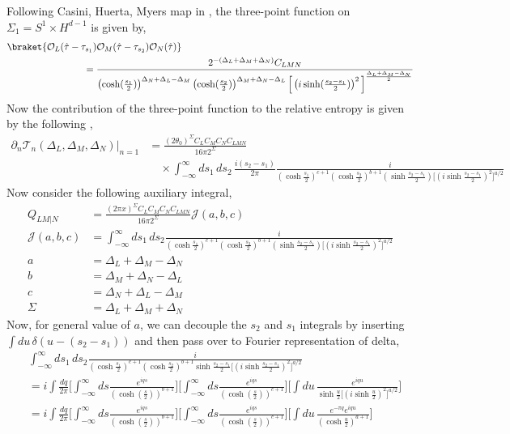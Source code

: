 \documentclass[11pt]{article}
\newcommand{\p}{\partial}
\newcommand{\mO}{\mathcal{O}}
\newcommand{\nn}{\nonumber}
\newcommand{\lb}{\left(}
\newcommand{\rb}{\right)}
\begin{document}
Following Casini, Huerta, Myers map in \cite{Casini_2011}, the three-point function on $\Sigma_1 = S^1 \times H^{d-1}$ is given by,
\begin{align}
    &\braket{\mO_L (\hat \tau - \tau_{s_1})\mO_M(\hat\tau - \tau_{s_2})\mO_N(\hat \tau)} \nn\\&\qquad\qquad\qquad\qquad=\frac{2^{-\lb \Delta_L+\Delta_M+\Delta_N\rb}C_{LMN}}{\lb\cosh(\frac{s_1}{2})\rb^{\Delta_N + \Delta_L -\Delta_M}\lb\cosh(\frac{s_2}{2})\rb^{\Delta_M + \Delta_N -\Delta_L}\Big[\lb i\sinh(\frac{s_2 - s_1}{2})\rb^{2}\Big]^{\frac{\Delta_L + \Delta_M-\Delta_N}{2}}}
\end{align}
Now the contribution of the three-point function to the relative entropy is given by the following \cite{S_rosi_2018},
\begin{align}
    \p_n \mathcal{T}_n(\Delta_L,\Delta_M,\Delta_N)|_{n=1}&= \frac{(2\theta_0)^\Sigma C_LC_MC_NC_{LMN}}{16\pi 2^\Sigma}\nn \\&\quad\times\int_{-\infty}^\infty ds_1 \, ds_2 \, \frac{i(s_2 - s_1)}{2\pi} \frac{i}{\lb\cosh\frac{s_1}{2}\rb^{c+1}\lb\cosh\frac{s_2}{2}\rb^{b+1}\lb\sinh\frac{s_2-s_1}{2}\rb\Big[\lb i\sinh\frac{s_2 - s_1}{2}\rb^2\Big]^{a/2}}
\end{align}
Now consider the following auxiliary integral,
\begin{align}
    Q_{LM|N} &= \frac{(2\pi x)^\Sigma C_LC_MC_NC_{LMN}}{16\pi 2^\Sigma}\mathcal{J}(a,b,c) \\
    \mathcal{J}(a,b,c) &= \int_{-\infty}^\infty ds_1 \, ds_2 \frac{i}{\lb\cosh\frac{s_1}{2}\rb^{c+1}\lb\cosh\frac{s_2}{2}\rb^{b+1}\lb\sinh\frac{s_2-s_1}{2}\rb\Big[\lb i\sinh\frac{s_2 - s_1}{2}\rb^2\Big]^{a/2}} \\
    a &= \Delta_L + \Delta_M - \Delta_N \\
    b &= \Delta_M + \Delta_N - \Delta_L \\
    c &= \Delta_N + \Delta_L - \Delta_M \\
    \Sigma &= \Delta_L + \Delta_M + \Delta_N 
\end{align}
Now, for general value of $a$, we can decouple the $s_2$ and $s_1$ integrals by inserting $\int du \, \delta (u - (s_2 - s_1))$ and then pass over to Fourier representation of delta,
\begin{align}
    &\int_{-\infty}^\infty ds_1 \, ds_2 \frac{i}{\lb\cosh\frac{s_1}{2}\rb^{c+1}\lb\cosh\frac{s_2}{2}\rb^{b+1}\sinh\frac{s_2-s_1}{2}\Big[\lb i\sinh\frac{s_2-s_1}{2}\rb^2\Big]^{a/2}} \\&= i\int\frac{dq}{2\pi} \Bigg[\int_{-\infty}^\infty ds\frac{e^{iqs}}{\lb\cosh\lb\frac{s}{2}\rb\rb^{b+1}}\Bigg] \Bigg[\int_{-\infty}^\infty ds\frac{e^{iqs}}{\lb\cosh\lb\frac{s}{2}\rb\rb^{c+1}}\Bigg]  \Bigg[\int du \, \frac{e^{iqu}}{\sinh\frac{u}{2}\Big[\lb i\sinh\frac{u}{2}\rb^{2}\Big]^{a/2}}\Bigg] \\
    &= i\int\frac{dq}{2\pi} \Bigg[\int_{-\infty}^\infty ds\frac{e^{iqs}}{\lb\cosh\lb\frac{s}{2}\rb\rb^{b+1}}\Bigg] \Bigg[\int_{-\infty}^\infty ds\frac{e^{iqs}}{\lb\cosh\lb\frac{s}{2}\rb\rb^{c+1}}\Bigg]  \Bigg[\int du \, \frac{e^{-\pi q}e^{iqu}}{\lb\cosh\frac{u}{2}\rb^{a+1}}\Bigg]
\end{align}
\end{document}
